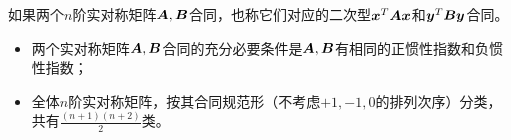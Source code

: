 \begin{frame}
  如果两个$n$阶实对称矩阵$\boldsymbol{A},\boldsymbol{B}$合同，也称它们对应的二次型${\boldsymbol{x}}^T\boldsymbol{A}{\boldsymbol{x}}$和${\boldsymbol{y}}^T\boldsymbol{B}{\boldsymbol{y}}$合同。
\end{frame}

\begin{frame}
  \begin{jielun}
    \begin{itemize}
    \item 两个实对称矩阵$\boldsymbol{A},\boldsymbol{B}$合同的充分必要条件是$\boldsymbol{A},\boldsymbol{B}$有相同的正惯性指数和负惯性指数；\\[0.1in]
    \item 全体$n$阶实对称矩阵，按其合同规范形（不考虑$+1,-1,0$的排列次序）分类，共有$\frac{(n+1)(n+2)}2$类。
    \end{itemize}
  \end{jielun}
\end{frame}

